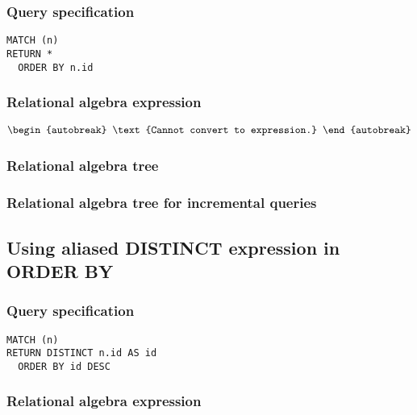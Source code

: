 \subsubsection*{Query specification}

\begin{lstlisting}
MATCH (n)
RETURN *
  ORDER BY n.id
\end{lstlisting}

\subsubsection*{Relational algebra expression}

\begin{align*}
\begin{autobreak}
\text{Cannot convert to expression.}
\end{autobreak}
\end{align*}

\subsubsection*{Relational algebra tree}


\subsubsection*{Relational algebra tree for incremental queries}


\subsection{Using aliased DISTINCT expression in ORDER BY}

\subsubsection*{Query specification}

\begin{lstlisting}
MATCH (n)
RETURN DISTINCT n.id AS id
  ORDER BY id DESC
\end{lstlisting}

\subsubsection*{Relational algebra expression}

